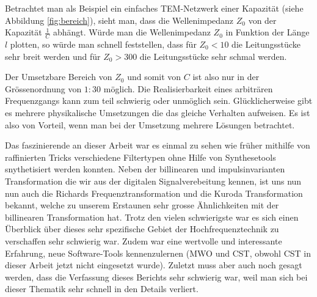Betrachtet  man als Beispiel  ein  einfaches  TEM-Netzwerk  einer  Kapazit\"at
(siehe Abbildung \ref{fig:bereich}), sieht man, dass die  Wellenimpedanz $Z_0$
von  der Kapazit\"at $\frac{1}{C}$ abh\"angt. W\"urde man  die  Wellenimpedanz
$Z_0$ in Funktion der L\"ange $l$ plotten, so w\"urde man schnell feststellen,
dass f\"ur $Z_0<10$ die Leitungsst\"ucke sehr breit werden und  f\"ur  $Z_0  >
300$ die Leitungsst\"ucke sehr schmal werden.

Der Umsetzbare Bereich von $Z_0$ und  somit  von  $C$  ist  also  nur  in  der
Gr\"ossenordnung von $1:30$ m\"oglich. Die Realisierbarkeit eines arbitr\"aren
Frequenzgangs    kann    zum    teil   schwierig   oder   unm\"oglich    sein.
Gl\"ucklicherweise gibt es  mehrere  physikalische Umsetzungen die das gleiche
Verhalten aufweisen.  Es  ist  also  von  Vorteil,  wenn man bei der Umsetzung
mehrere L\"osungen betrachtet.

Das faszinierende an dieser Arbeit war es einmal zu sehen wie früher mithilfe von raffinierten Tricks verschiedene Filtertypen ohne Hilfe von Synthesetools snythetisiert werden konnten. Neben der billinearen und impulsinvarianten Transformation die wir aus der digitalen Signalverebeitung kennen, ist uns nun nun auch die Richards Frequenztransformation und die Kuroda Transformation bekannt, welche zu unserem Erstaunen sehr grosse Ähnlichkeiten mit der billinearen Transformation hat. Trotz den vielen  schwierigste war es sich einen Überblick über dieses sehr spezifische Gebiet der Hochfrequenztechnik zu verschaffen sehr schwierig war. Zudem war  eine  wertvolle  und  interessante  Erfahrung,  neue  Software-Tools
kennenzulernen  (MWO  und  CST,  obwohl  CST  in  dieser  Arbeit  jetzt  nicht
eingesetzt wurde). Zuletzt muss aber auch noch gesagt werden, dass die Verfassung dieses Berichts sehr schwierig war, weil man sich bei dieser Thematik sehr schnell in den Details verliert.

